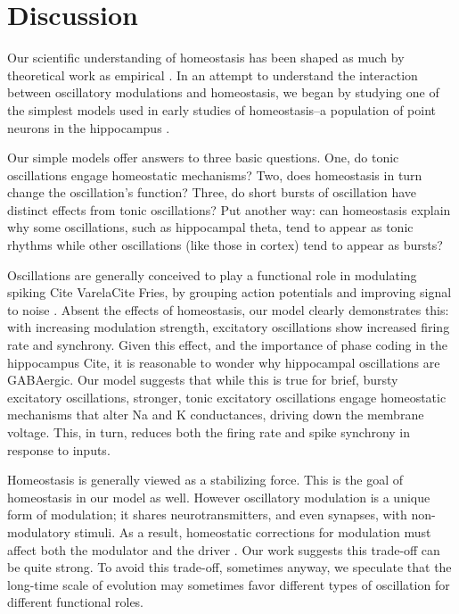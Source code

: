 \documentclass{article}
\begin{document}
\section*{Discussion}
Our scientific understanding of homeostasis has been shaped as much by theoretical work as empirical \cite{Marder2014}. In an attempt to understand the interaction between oscillatory modulations and homeostasis, we began by studying one of the simplest models used in early studies of homeostasis--a population of point neurons in the hippocampus \cite{LeMasson1993}.

Our simple models offer answers to three basic questions. One, do tonic oscillations engage homeostatic mechanisms? Two, does homeostasis in turn change the oscillation's function? Three, do short bursts of oscillation have distinct effects from tonic oscillations? Put another way: can homeostasis explain why some oscillations, such as hippocampal theta, tend to appear as tonic rhythms while other oscillations (like those in cortex) tend to appear as bursts?

Oscillations are generally conceived to play a functional role in modulating spiking {Cite Varela}{Cite Fries}, by grouping action potentials and improving signal to noise \cite{Chen2013,Zhou2015,Voytek2015a,Peterson2017}. Absent the effects of homeostasis, our model clearly demonstrates this: with increasing modulation strength, excitatory oscillations show increased firing rate and synchrony. Given this effect, and the importance of phase coding in the hippocampus {Cite}, it is reasonable to wonder why hippocampal oscillations are GABAergic. Our model suggests that while this is true for brief, bursty excitatory oscillations, stronger, tonic excitatory oscillations engage homeostatic mechanisms that alter Na and K conductances, driving down the membrane voltage. This, in turn, reduces both the firing rate and spike synchrony in response to inputs.

Homeostasis is generally viewed as a stabilizing force. This is the goal of homeostasis in our model as well. However oscillatory modulation is a unique form of modulation; it shares neurotransmitters, and even synapses, with non-modulatory stimuli. As a result, homeostatic corrections for modulation must affect both the modulator and the driver \cite{Sherman1998}. Our work suggests this trade-off can be quite strong. To avoid this trade-off, sometimes anyway, we speculate that the long-time scale of evolution may sometimes favor different types of oscillation for different functional roles.
\end{document}
